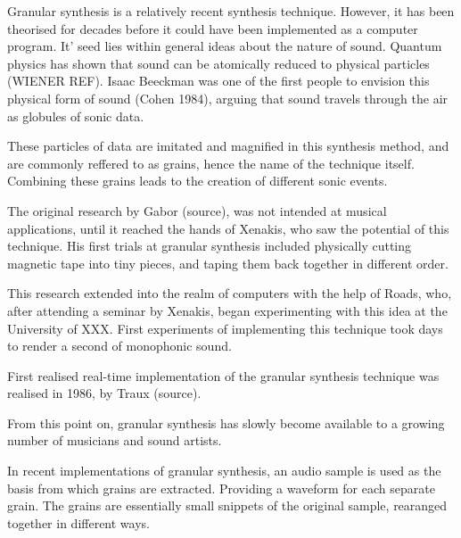 Granular synthesis is a relatively recent synthesis
technique. However, it has been theorised for decades before it could
have been implemented as a computer program. It' seed lies within 
general ideas about the nature of sound. Quantum physics has shown
that sound can be atomically reduced to physical particles (WIENER
REF). Isaac Beeckman was one of the first people to envision this
physical form of sound (Cohen 1984), arguing that sound travels
through the air as globules of sonic data.

These particles of data are imitated and magnified in this synthesis
method, and are commonly reffered to as grains, hence the
name of the technique itself. Combining these grains leads to the
creation of different sonic events.

The original research by Gabor (source), was not intended at musical
applications, until it reached the hands of Xenakis, who saw the
potential of this technique. His first trials at granular synthesis
included physically cutting magnetic tape into tiny pieces, and taping
them back together in different order.

This research extended into the realm of computers with the help of
Roads, who, after attending a seminar by Xenakis, began experimenting
with this idea at the University of XXX. First experiments of
implementing this technique took days to render a second of monophonic
sound. 

First realised real-time implementation of the granular synthesis
technique was realised in 1986, by Traux (source).

From this point on, granular synthesis has slowly become available to
a growing number of musicians and sound artists.



In recent implementations of granular synthesis, an audio sample is
used as the basis from which grains are extracted. Providing a
waveform for each separate grain. The grains are essentially
small snippets of the original sample, rearanged together in
different ways.

